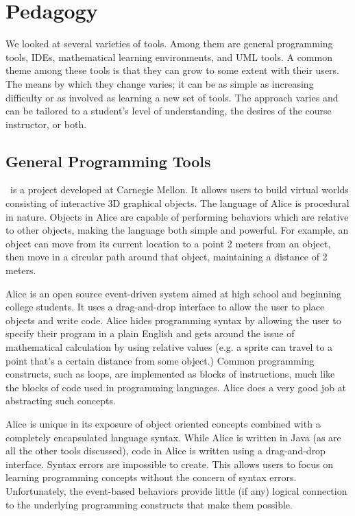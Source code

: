 \documentclass{sig-alt-release}
\begin{document}
\section{Pedagogy}
  We looked at several varieties of tools. Among them are general programming
  tools, IDEs, mathematical learning environments, and UML tools. A common theme
  among these tools is that they can grow to some extent with their users. The
  means by which they change varies; it can be as simple as increasing
  difficulty or as involved as learning a new set of tools. The approach varies
  and can be tailored to a student's level of understanding, the desires of the
  course instructor, or both.

  \subsection{General Programming Tools}
    \alice\ is a project developed at Carnegie Mellon. It allows users to build
    virtual worlds consisting of interactive 3D graphical objects. The language
    of Alice is procedural in nature. Objects in Alice are capable of performing
    behaviors which are relative to other objects, making the language both
    simple and powerful. For example, an object can move from its current
    location to a point 2 meters from an object, then move in a circular path
    around that object, maintaining a distance of 2 meters.
  
    Alice is an open source event-driven system aimed at high school and
    beginning college students. It uses a drag-and-drop interface to allow the
    user to place objects and write code. Alice hides programming syntax by
    allowing the user to specify their program in a plain English and gets
    around the issue of mathematical calculation by using relative values (e.g.
    a sprite can travel to a point that's a certain distance from some object.)
    Common programming constructs, such as loops, are implemented as blocks of
    instructions, much like the blocks of code used in programming languages.
    Alice does a very good job at abstracting such concepts.
    
    Alice is unique in its exposure of object oriented concepts combined with a
    completely encapsulated language syntax. While Alice is written in Java (as
    are all the other tools discussed), code in Alice is written using a
    drag-and-drop interface. Syntax errors are impossible to create. This allows
    users to focus on learning programming concepts without the concern of
    syntax errors. Unfortunately, the event-based behaviors provide little (if
    any) logical connection to the underlying programming constructs that make
    them possible.
    
\end{document}
